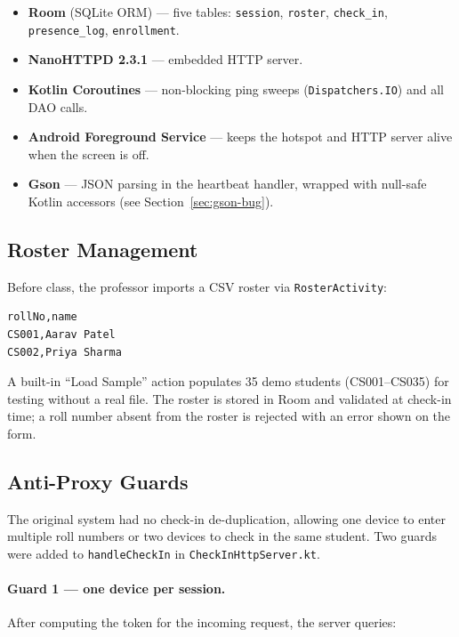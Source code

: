 \documentclass[sigconf,nonacm]{acmart}
\begin{document}
\begin{itemize}
  \item \textbf{Room} (SQLite ORM) --- five tables: \texttt{session},
        \texttt{roster}, \texttt{check\_in}, \texttt{presence\_log},
        \texttt{enrollment}.
  \item \textbf{NanoHTTPD 2.3.1} --- embedded HTTP server.
  \item \textbf{Kotlin Coroutines} --- non-blocking ping sweeps
        (\texttt{Dispatchers.IO}) and all DAO calls.
  \item \textbf{Android Foreground Service} --- keeps the hotspot and
        HTTP server alive when the screen is off.
  \item \textbf{Gson} --- JSON parsing in the heartbeat handler,
        wrapped with null-safe Kotlin accessors (see
        Section~\ref{sec:gson-bug}).
\end{itemize}

\subsection{Roster Management}

Before class, the professor imports a CSV roster via
\texttt{Roster\-Activity}:

\begin{lstlisting}
rollNo,name
CS001,Aarav Patel
CS002,Priya Sharma
\end{lstlisting}

A built-in ``Load Sample'' action populates 35 demo students
(CS001--CS035) for testing without a real file.  The roster is stored
in Room and validated at check-in time; a roll number absent from the
roster is rejected with an error shown on the form.

\subsection{Anti-Proxy Guards}
\label{sec:proxy}

The original system had no check-in de-duplication, allowing one device
to enter multiple roll numbers or two devices to check in the same
student.  Two guards were added to \texttt{handleCheckIn} in
\texttt{CheckInHttpServer.kt}.

\paragraph{Guard 1 --- one device per session.}
After computing the token for the incoming request, the server queries:
\end{document}
